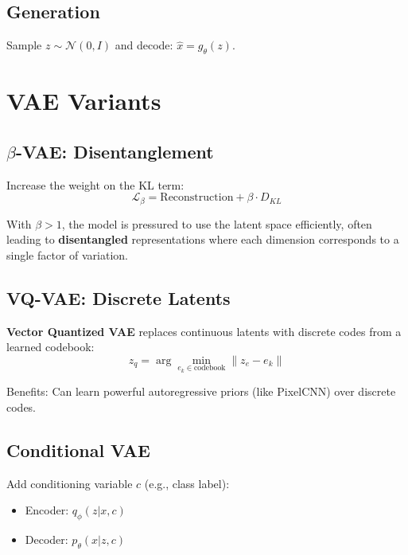 \subsection{Generation}

Sample $z \sim \mathcal{N}(0, I)$ and decode: $\hat{x} = g_\theta(z)$.


\section{VAE Variants}

\subsection{$\beta$-VAE: Disentanglement}


Increase the weight on the KL term:
\begin{equation}
    \mathcal{L}_\beta = \text{Reconstruction} + \beta \cdot D_{KL}
\end{equation}

With $\beta > 1$, the model is pressured to use the latent space efficiently, often leading to \textbf{disentangled} representations where each dimension corresponds to a single factor of variation.

\subsection{VQ-VAE: Discrete Latents}


\textbf{Vector Quantized VAE} replaces continuous latents with discrete codes from a learned codebook:
\begin{equation}
    z_q = \arg\min_{e_k \in \text{codebook}} \|z_e - e_k\|
\end{equation}

Benefits: Can learn powerful autoregressive priors (like PixelCNN) over discrete codes.

\subsection{Conditional VAE}

Add conditioning variable $c$ (e.g., class label):
\begin{itemize}
    \item Encoder: $q_\phi(z|x, c)$
    \item Decoder: $p_\theta(x|z, c)$
\end{itemize}

